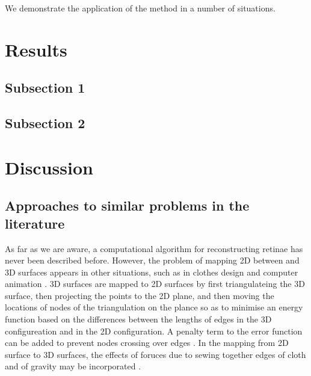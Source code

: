 \documentclass[10pt]{article}
\begin{document}

We demonstrate the application of the method in a number of
situations. 


\section*{Results}

\subsection*{Subsection 1}

\subsection*{Subsection 2}

\section*{Discussion}


\subsection*{Approaches to similar problems in the literature}
\label{fold-sphere:sec:appr-simil-probl}

As far as we are aware, a computational algorithm for reconstructing
retinae has never been described before. However, the problem of
mapping 2D between and 3D surfaces appears in other situations, such
as in clothes design and computer animation
\cite{FanEtal98spri,MaCaEtal99flat,WangEtal02surf}. 3D surfaces are
mapped to 2D surfaces by first triangulateing the 3D surface, then
projecting the points to the 2D plane, and then moving the locations
of nodes of the triangulation on the plance so as to minimise an
energy function based on the differences between the lengths of edges
in the 3D configureation and in the 2D configuration. A penalty term
to the error function can be added to prevent nodes crossing over
edges \cite{WangEtal02surf}. In the mapping from 2D surface to 3D
surfaces, the effects of foruces due to sewing together edges of cloth
and of gravity may be incorporated \cite{FanEtal98spri}.
\end{document}
